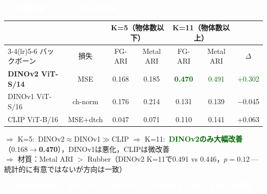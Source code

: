 \documentclass[dvipdfmx,a4paper,landscape]{jarticle}
\newcommand{\sechead}[1]{%
  \colorbox{secblue}{\textcolor{white}{\scriptsize\textbf{\,#1\,}}}%
}
\begin{document}
\begin{minipage}[t]{0.65\linewidth}
\sechead{2.\ 定量結果：スロット数Kの効果%
\,\textcolor{staryellow}{$\bigstar$}}
\vspace{1mm}

\centering\scriptsize
\begin{tabular}{lcccccc}
\toprule
 & & \multicolumn{2}{c}{K=5（物体数以下）} & \multicolumn{2}{c}{K=11（物体数以上）} & \\
\cmidrule(lr){3-4}\cmidrule(lr){5-6}
バックボーン & 損失 & FG-ARI & Metal ARI & FG-ARI & Metal ARI & $\Delta$ \\
\midrule
\textbf{DINOv2 ViT-S/14} & MSE & 0.168 & 0.185 & \textcolor{darkgreen}{\textbf{0.470}} & \textcolor{darkgreen}{0.491} & \textcolor{darkgreen}{+0.302} \\
DINOv1 ViT-S/16 & ch-norm & 0.176 & 0.214 & 0.131 & 0.139 & \textcolor{accentred}{$-$0.045} \\
CLIP ViT-B/16 & MSE+dtch & 0.047 & 0.071 & 0.110 & 0.141 & +0.063 \\
\bottomrule
\end{tabular}

\vspace{1mm}
\raggedright\scriptsize
$\Rightarrow$ K=5:\ DINOv2$\approx$DINOv1$\gg$CLIP\qquad
$\Rightarrow$ K=11:\ \textcolor{darkgreen}{\textbf{DINOv2のみ大幅改善}}（0.168$\to$\textbf{0.470}），DINOv1は悪化，CLIPは微改善\\
$\Rightarrow$ 材質：Metal ARI $>$ Rubber（DINOv2 K=11で0.491 vs 0.446，$p{=}0.12$\,---\,統計的に有意ではないが方向は一致）
\end{minipage}

\vspace{2mm}

\noindent
\sechead{3.\ 失敗要因分析：なぜDINOv2だけがK=11で成功するのか%
\,\textcolor{staryellow}{$\bigstar$\,中心的貢献}}

\vspace{1mm}
\end{document}
